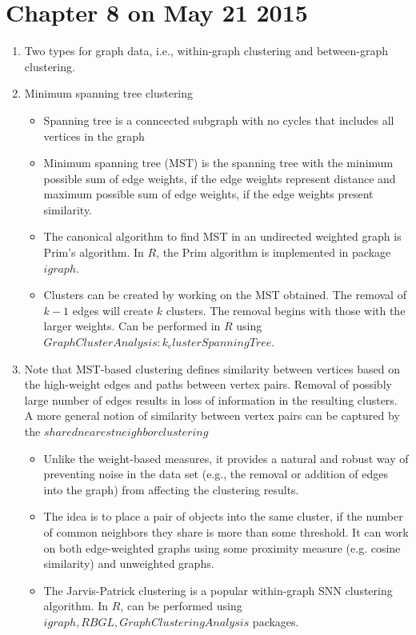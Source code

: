 \documentclass[14pt]{article}
\begin{document}
\section{Chapter 8 on May 21 2015}
\begin{enumerate}
 \item Two types for graph data, i.e., within-graph clustering and between-graph clustering.
 
 \item Minimum spanning tree clustering
  \begin{itemize}
   \item Spanning tree is a conncected subgraph with no cycles that includes all vertices in the graph
   \item Minimum spanning tree (MST) is the spanning tree with the minimum possible sum of edge weights, if the edge weights represent distance and maximum possible sum of edge weights, if the edge weights present similarity.
   \item The canonical algorithm to find MST in an undirected weighted graph is Prim's algorithm. In $R$, the Prim algorithm is implemented in package $igraph$.
   \item Clusters can be created by working on the MST obtained. The removal of $k-1$ edges will create $k$ clusters. The removal begins with those with the larger weights. Can be performed in $R$ using $GraphClusterAnalysis: k_clusterSpanningTree$.
  \end{itemize}
  
  \item Note that MST-based clustering defines similarity between vertices based on the high-weight edges and paths between vertex pairs. Removal of possibly large number of edges results in loss of information in the resulting clusters. A more general notion of similarity between vertex pairs can be captured by the $shared nearest neighbor clustering$
   \begin{itemize}
    \item Unlike the weight-based measures, it provides a natural and robust way of preventing noise in the data set (e.g., the removal or addition of edges into the graph) from affecting the clustering results.
    \item The idea is to place a pair of objects into the same cluster, if the number of common neighbors they share is more than some threshold. It can work on both edge-weighted graphs using some proximity measure (e.g. cosine similarity) and unweighted graphs.
    \item The Jarvis-Patrick clustering is a popular within-graph SNN clustering algorithm. In $R$, can be performed using $igraph, RBGL, GraphClusteringAnalysis$ packages.  
   \end{itemize}
   

\end{enumerate}
\end{document}
